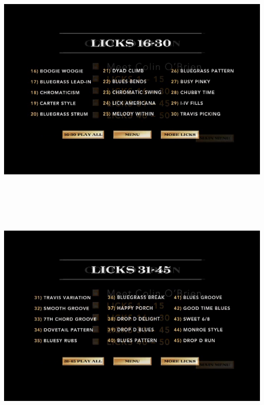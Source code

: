 \documentclass[a4paper]{book}
\begin{document}
\begin{center}
\includegraphics[width=17cm,height=11.333cm]{lebluessupportsmethodes-img2.png}
\end{center}


\begin{center}
\includegraphics[width=17cm,height=11.333cm]{lebluessupportsmethodes-img3.png}
\end{center}
\end{document}
